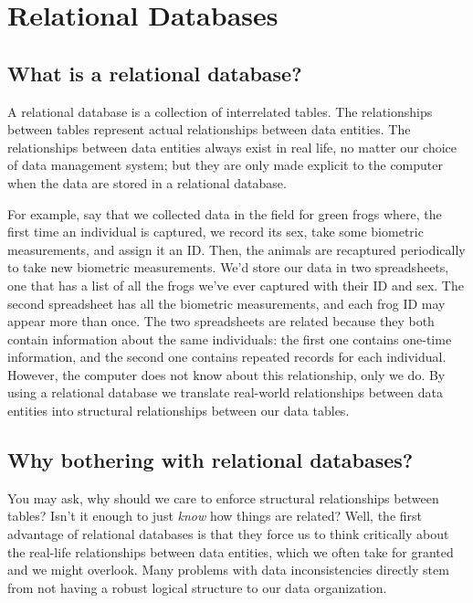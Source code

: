 \documentclass[
]{book}
\begin{document}
\hypertarget{relational-databases}{%
\chapter{Relational Databases}\label{relational-databases}}

\hypertarget{what-is-a-relational-database}{%
\section{What is a relational database?}\label{what-is-a-relational-database}}

A relational database is a collection of interrelated tables. The relationships between tables represent actual relationships between data entities. The relationships between data entities always exist in real life, no matter our choice of data management system; but they are only made explicit to the computer when the data are stored in a relational database.

For example, say that we collected data in the field for green frogs where, the first time an individual is captured, we record its sex, take some biometric measurements, and assign it an ID. Then, the animals are recaptured periodically to take new biometric measurements. We'd store our data in two spreadsheets, one that has a list of all the frogs we've ever captured with their ID and sex. The second spreadsheet has all the biometric measurements, and each frog ID may appear more than once. The two spreadsheets are related because they both contain information about the same individuals: the first one contains one-time information, and the second one contains repeated records for each individual. However, the computer does not know about this relationship, only we do. By using a relational database we translate real-world relationships between data entities into structural relationships between our data tables.

\hypertarget{why-bothering-with-relational-databases}{%
\section{Why bothering with relational databases?}\label{why-bothering-with-relational-databases}}

You may ask, why should we care to enforce structural relationships between tables? Isn't it enough to just \emph{know} how things are related? Well, the first advantage of relational databases is that they force us to think critically about the real-life relationships between data entities, which we often take for granted and we might overlook. Many problems with data inconsistencies directly stem from not having a robust logical structure to our data organization.
\end{document}
